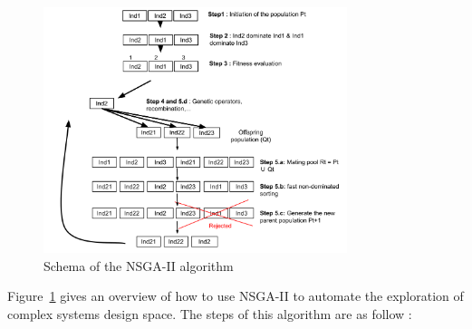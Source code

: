 \documentclass[conference]{IEEEtran}
\begin{document}
\begin{figure}[!ht]
\centering
\includegraphics[width=3.49in]{NSGAII.pdf}
\caption{Schema of the NSGA-II algorithm}
\label{nsgaii}
\end{figure}

Figure~\ref{nsgaii} gives an overview of how to use NSGA-II to automate the exploration of complex systems design space. The steps of this algorithm are as follow :
\end{document}
